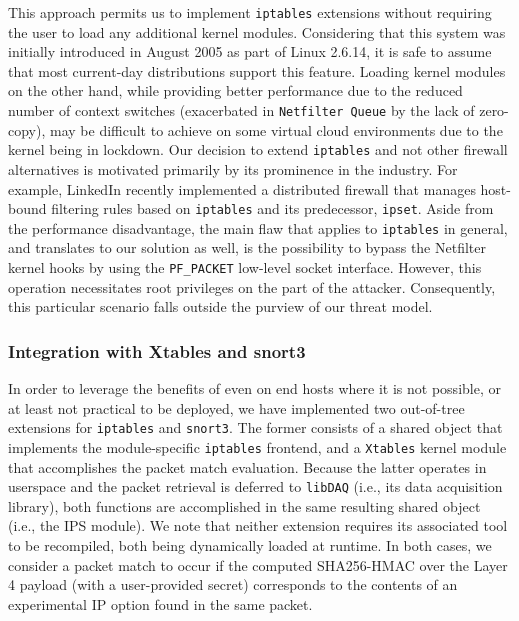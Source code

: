 This approach permits us to implement \texttt{iptables} extensions without requiring the user to load any additional kernel modules. Considering that this system was initially introduced in August 2005 as part of Linux 2.6.14, it is safe to assume that most current-day distributions support this feature. Loading kernel modules on the other hand, while providing better performance due to the reduced number of context switches (exacerbated in \texttt{Netfilter Queue} by the lack of zero-copy), may be difficult to achieve on some virtual cloud environments due to the kernel being in lockdown. Our decision to extend \texttt{iptables} and not other firewall alternatives is motivated primarily by its prominence in the industry. For example, LinkedIn recently implemented a distributed firewall \cite{linkedin_dfw} that manages host-bound filtering rules based on \texttt{iptables} and its predecessor, \texttt{ipset}. Aside from the performance disadvantage, the main flaw that applies to \texttt{iptables} in general, and translates to our solution as well, is the possibility to bypass the Netfilter kernel hooks by using the \texttt{PF\_PACKET} low-level socket interface. However, this operation necessitates root privileges on the part of the attacker. Consequently, this particular scenario falls outside the purview of our threat model.


\subsubsection{Integration with Xtables and snort3}

In order to leverage the benefits of \daf{} even on end hosts where it is not possible, or at least not practical to be deployed, we have implemented two out-of-tree extensions for \texttt{iptables} and \texttt{snort3}. The former consists of a shared object that implements the module-specific \texttt{iptables} frontend, and a \texttt{Xtables} kernel module that accomplishes the packet match evaluation. Because the latter operates in userspace and the packet retrieval is deferred to \texttt{libDAQ} (i.e., its data acquisition library), both functions are accomplished in the same resulting shared object (i.e., the IPS module). We note that neither extension requires its associated tool to be recompiled, both being dynamically loaded at runtime. In both cases, we consider a packet match to occur if the computed SHA256-HMAC over the Layer 4 payload (with a user-provided secret) corresponds to the contents of an experimental IP option found in the same packet.

